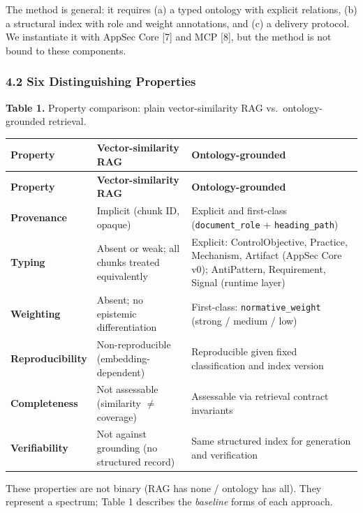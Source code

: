 \documentclass[
]{article}
\begin{document}
The method is general: it requires (a) a typed ontology with explicit
relations, (b) a structural index with role and weight annotations, and
(c) a delivery protocol. We instantiate it with AppSec Core {[}7{]} and
MCP {[}8{]}, but the method is not bound to these components.

\subsubsection{4.2 Six Distinguishing
Properties}\label{six-distinguishing-properties}

\textbf{Table 1.} Property comparison: plain vector-similarity RAG
vs.~ontology-grounded retrieval.

\begin{longtable}{@{}>{\RaggedRight\arraybackslash}p{2.55cm}>{\RaggedRight\arraybackslash}p{5.2cm}>{\RaggedRight\arraybackslash}p{5.2cm}@{}}
\toprule
\textbf{Property} & \textbf{Vector-similarity RAG} & \textbf{Ontology-grounded} \\
\midrule
\endfirsthead
\toprule
\textbf{Property} & \textbf{Vector-similarity RAG} & \textbf{Ontology-grounded} \\
\midrule
\endhead
\bottomrule
\endfoot
\bottomrule
\endlastfoot
\textbf{Provenance} & Implicit (chunk ID, opaque) & Explicit and first-class (\texttt{document\_role} + \texttt{heading\_path}) \\
\textbf{Typing} & Absent or weak; all chunks treated equivalently & Explicit: ControlObjective, Practice, Mechanism, Artifact (AppSec Core v0); AntiPattern, Requirement, Signal (runtime layer) \\
\textbf{Weighting} & Absent; no epistemic differentiation & First-class: \texttt{normative\_weight} (strong / medium / low) \\
\textbf{Reproducibility} & Non-reproducible (embedding-dependent) & Reproducible given fixed classification and index version \\
\textbf{Completeness} & Not assessable (similarity $\neq$ coverage) & Assessable via retrieval contract invariants \\
\textbf{Verifiability} & Not against grounding (no structured record) & Same structured index for generation and verification \\
\end{longtable}

These properties are not binary (RAG has none / ontology has all). They
represent a spectrum; Table 1 describes the \emph{baseline} forms of
each approach.
\end{document}
